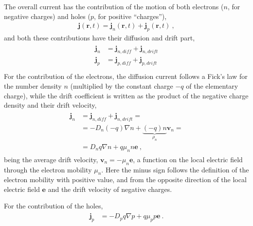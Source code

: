 \documentclass[letterpaper,10pt,english]{jupyterBook}
\begin{document}
\sphinxAtStartPar
The overall current has the contribution of the motion of both electrons (\(n\), for negative charges) and holes (\(p\), for positive “charges”),
\begin{equation*}
\begin{split}\mathbf{j}(\mathbf{r},t) = \mathbf{j}_n(\mathbf{r},t) + \mathbf{j}_p(\mathbf{r},t) \ ,\end{split}
\end{equation*}
\sphinxAtStartPar
and both these contributions have their diffusion and drift part,
\begin{equation*}
\begin{split}\begin{aligned}
  \mathbf{j}_n & = \mathbf{j}_{n,diff} + \mathbf{j}_{n,drift} \\
  \mathbf{j}_p & = \mathbf{j}_{p,diff} + \mathbf{j}_{p,drift} \\
\end{aligned}\end{split}
\end{equation*}
\sphinxAtStartPar
For the contribution of the electrons, the diffusion current follows a Fick’s law for the number density \(n\) (multiplied by the constant charge \(-q\) of the elementary charge), while the drift coefficient is written as the product of the negative charge density and their drift velocity,
\begin{equation}\label{equation:ch/solid-state/semiconductors-transport-phenomena:eq:semi:charge-current-n}
\begin{split}\begin{aligned}
  \mathbf{j}_n 
  & = \mathbf{j}_{n,diff} + \mathbf{j}_{n,drift} = \\
  & = - D_n (-q) \nabla n + \underbrace{(-q) n}_{\rho_n} \mathbf{v}_n = \\
  & = D_n q \nabla n + q \mu_n n \mathbf{e} \ ,
\end{aligned}\end{split}
\end{equation}
\sphinxAtStartPar
being the average drift velocity, \(\mathbf{v}_n = - \mu_n \mathbf{e}\), a function on the local electric field through the electron mobility \(\mu_n\). Here the minus sign follows the definition of the electron mobility with positive value, and from the opposite direction of the local electric field \(\mathbf{e}\) and the drift velocity of negative charges.

\sphinxAtStartPar
For the contribution of the holes,
\begin{equation}\label{equation:ch/solid-state/semiconductors-transport-phenomena:eq:semi:charge-current-p}
\begin{split}\begin{aligned}
  \mathbf{j}_p 
  & = - D_p q \nabla p + q \mu_p p \mathbf{e} \ .
\end{aligned}\end{split}
\end{equation}
\end{document}
